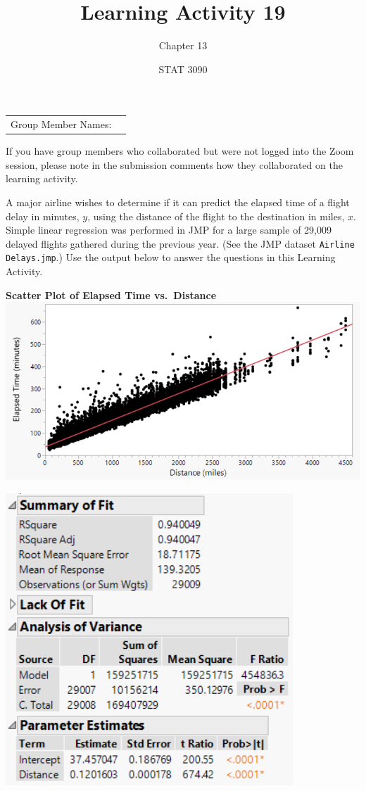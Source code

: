 \documentclass[noanswers]{exam}
\title{Learning Activity 19}
\author{Chapter 13}
\date{STAT 3090}
\begin{document}
\noindent\begin{tabular}{@{}p{1.4in}p{5.2in}@{}}
Group Member Names: & \hrulefill
\end{tabular}

\vspace{1mm}
\noindent If you have group members who collaborated but were not logged into the Zoom session, please note in the submission comments how they collaborated on the learning activity.

\vspace{5mm}

\noindent A major airline wishes to determine if it can predict the elapsed time of a flight delay in minutes, $y$, using the distance of the flight to the destination in miles, $x$. Simple linear regression was performed in JMP for a large sample of 29,009 delayed flights gathered during the previous year. (See the JMP dataset \verb|Airline Delays.jmp|.) Use the output below to answer the questions in this Learning Activity.

\begin{multicols}{2}
	\noindent \textbf{Scatter Plot of Elapsed Time vs.\ Distance}
	\includegraphics[scale=.55]{STAT_3090_LA19_scatter-plot.PNG}
	\begin{flushright}
	\includegraphics[scale=.75]{STAT_3090_LA19_linear-regression.PNG}
	\end{flushright}
\end{multicols}
\end{document}
